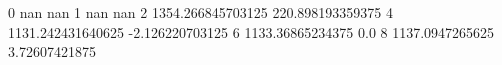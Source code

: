 0 nan nan
1 nan nan
2 1354.266845703125 220.898193359375
4 1131.242431640625 -2.126220703125
6 1133.36865234375 0.0
8 1137.0947265625 3.72607421875
